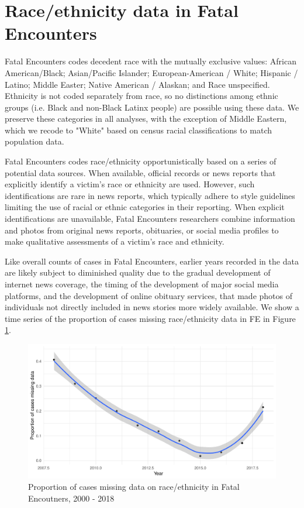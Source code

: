 \documentclass{article}
\begin{document}
\section{Race/ethnicity data in Fatal Encounters}

Fatal Encounters codes decedent race with the mutually exclusive values: African American/Black; Asian/Pacific Islander; European-American / White; Hispanic / Latino; Middle Easter; Native American / Alaskan; and Race unspecified. Ethnicity is not coded separately from race, so no distinctions among ethnic groups (i.e. Black and non-Black Latinx people) are possible using these data. We preserve these categories in all analyses, with the exception of Middle Eastern, which we recode to "White" based on census racial classifications to match population data. 

Fatal Encounters codes race/ethnicity opportunistically based on a series of potential data sources. When available, official records or news reports that explicitly identify a victim's race or ethnicity are used. However, such identifications are rare in news reports, which typically adhere to style guidelines limiting the use of racial or ethnic categories in their reporting. When explicit identifications are unavailable, Fatal Encounters researchers combine information and photos from original news reports, obituaries, or social media profiles to make qualitative assessments of a victim's race and ethnicity. 

Like overall counts of cases in Fatal Encounters, earlier years recorded in the data are likely subject to diminished quality due to the gradual development of internet news coverage, the timing of the development of major social media platforms, and the development of online obituary services, that made photos of individuals not directly included in news stories more widely available. We show a time series of the proportion of cases missing race/ethnicity data in FE in Figure \ref{fig:missing_race_ts}.

\begin{figure}
	\centering
	\includegraphics[width=\linewidth]{vis/prop_missing_race.pdf}
	\caption{Proportion of cases missing data on race/ethnicity in Fatal Encoutners, 2000 - 2018}
	\label{fig:missing_race_ts}
\end{figure}
\end{document}

